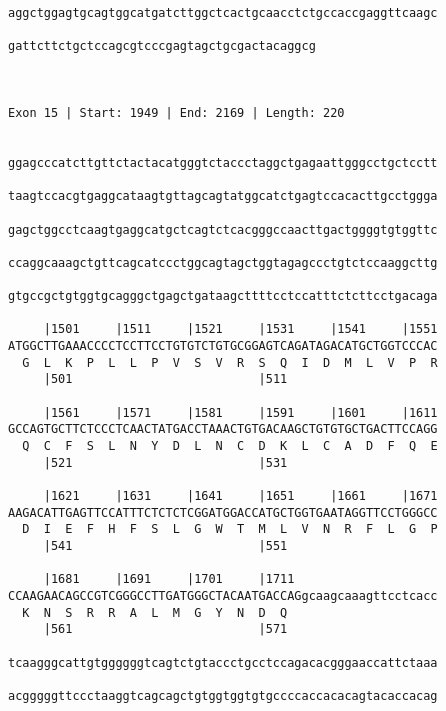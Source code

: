 \documentclass{article}
\begin{document}
\begin{Verbatim}
aggctggagtgcagtggcatgatcttggctcactgcaacctctgccaccgaggttcaagc
                                                            
gattcttctgctccagcgtcccgagtagctgcgactacaggcg
                                           
                                           
 
Exon 15 | Start: 1949 | End: 2169 | Length: 220


ggagcccatcttgttctactacatgggtctaccctaggctgagaattgggcctgctcctt
                                                            
taagtccacgtgaggcataagtgttagcagtatggcatctgagtccacacttgcctggga
                                                            
gagctggcctcaagtgaggcatgctcagtctcacgggccaacttgactggggtgtggttc
                                                            
ccaggcaaagctgttcagcatccctggcagtagctggtagagccctgtctccaaggcttg
                                                            
gtgccgctgtggtgcagggctgagctgataagcttttcctccatttctcttcctgacaga
                                                            
     |1501     |1511     |1521     |1531     |1541     |1551
ATGGCTTGAAACCCCTCCTTCCTGTGTCTGTGCGGAGTCAGATAGACATGCTGGTCCCAC
  G  L  K  P  L  L  P  V  S  V  R  S  Q  I  D  M  L  V  P  R
     |501                          |511                     
  
     |1561     |1571     |1581     |1591     |1601     |1611
GCCAGTGCTTCTCCCTCAACTATGACCTAAACTGTGACAAGCTGTGTGCTGACTTCCAGG
  Q  C  F  S  L  N  Y  D  L  N  C  D  K  L  C  A  D  F  Q  E
     |521                          |531                     
  
     |1621     |1631     |1641     |1651     |1661     |1671
AAGACATTGAGTTCCATTTCTCTCTCGGATGGACCATGCTGGTGAATAGGTTCCTGGGCC
  D  I  E  F  H  F  S  L  G  W  T  M  L  V  N  R  F  L  G  P
     |541                          |551                     
  
     |1681     |1691     |1701     |1711                    
CCAAGAACAGCCGTCGGGCCTTGATGGGCTACAATGACCAGgcaagcaaagttcctcacc
  K  N  S  R  R  A  L  M  G  Y  N  D  Q                     
     |561                          |571                     
  
tcaagggcattgtggggggtcagtctgtaccctgcctccagacacgggaaccattctaaa
                                                            
acgggggttccctaaggtcagcagctgtggtggtgtgccccaccacacagtacaccacag
                                                            

\end{Verbatim}
\end{document}
